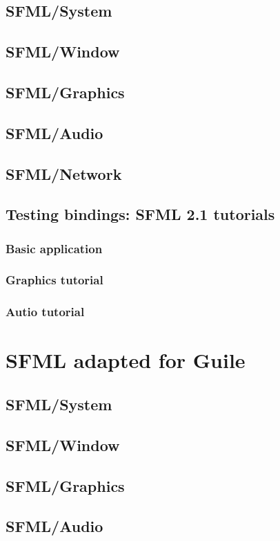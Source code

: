 \documentclass[latterpaper, leqno]{article}
\begin{document}
\subsection{SFML/System}
\subsection{SFML/Window}
\subsection{SFML/Graphics}
\subsection{SFML/Audio}
\subsection{SFML/Network}
\subsection{Testing bindings: SFML 2.1 tutorials}
\subsubsection*{Basic application}
\subsubsection*{Graphics tutorial}
\subsubsection*{Autio tutorial}

\section{SFML adapted for Guile}
\subsection{SFML/System}
\subsection{SFML/Window}
\subsection{SFML/Graphics}
\subsection{SFML/Audio}
\end{document}
